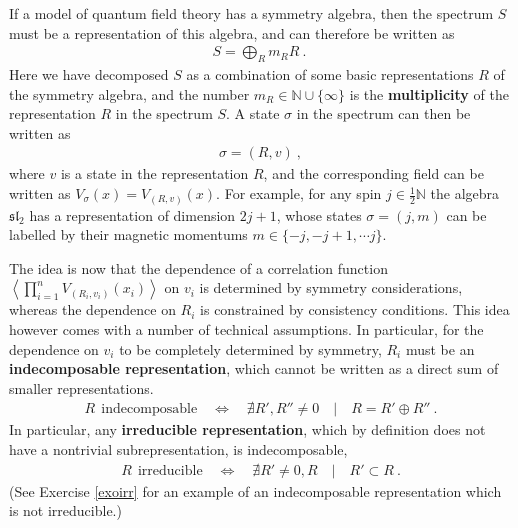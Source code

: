 \documentclass[12pt,a4paper,notitlepage]{report}
\numberwithin{equation}{section}
\theoremstyle{break}
\begin{document}
If a model of quantum field theory has a symmetry algebra, then the spectrum $S$ must be a representation of this algebra, and can therefore be written as
\begin{align}
 S = \bigoplus_R m_R  R\ .\
\label{somr}
\end{align}
Here we have decomposed $S$ as a combination of some basic representations $R$ of the symmetry algebra, and the number $m_R \in {\mathbb{N}}\cup\{\infty\}$ is the \textbf{\boldmath multiplicity} of the representation $R$ in the spectrum $S$.
A state $\sigma$ in the spectrum can then be written as 
\begin{align}
 \sigma = (R,v)\ ,
\label{arv}
\end{align}
where $v$ is a state in the representation $R$, and the corresponding field can be written as 
$V_\sigma(x)= V_{(R,v)}(x)$. For example, for any spin $j\in \frac12 \mathbb{N}$ the algebra $\mathfrak{sl}_2$ has a representation of dimension $2j+1$, whose states $\sigma = (j,m)$ can be labelled by their magnetic momentums $m\in\{-j, -j+1,\cdots j\}$.

The idea is now that the dependence of a correlation function $\left\langle \prod_{i=1}^n V_{(R_i,v_i)}(x_i)\right\rangle$ on $v_i$ is determined by symmetry considerations, whereas the dependence on $R_i$ is constrained by consistency conditions.
This idea however comes with a number of technical assumptions.
In particular, for the dependence on $v_i$ to be completely determined by symmetry, $R_i$ must be an \textbf{\boldmath indecomposable representation}, which cannot be written as a direct sum of smaller representations.
\begin{align}
 R \ \ \text{indecomposable} \quad \Leftrightarrow \quad \nexists R',R'' \neq 0 \quad | \quad R = R'\oplus R''\ .
\end{align}
In particular, any \textbf{\boldmath irreducible representation}, which by definition does not have a nontrivial subrepresentation, is indecomposable,
\begin{align}
 R \ \ \text{irreducible} \quad \Leftrightarrow \quad \nexists R' \neq 0,R \quad | \quad R'\subset R\ .
\end{align}
(See Exercise \ref{exoirr} for an example of an indecomposable representation which is not irreducible.)
\end{document}
